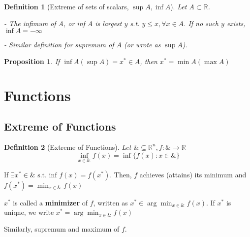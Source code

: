 \documentclass[11pt,a4paper]{article}
\newtheorem{definition}{Definition}
\newtheorem{proposition}{Proposition}
\begin{document}
\begin{definition}[Extreme of sets of scalars, $\sup A,\inf A$]
    Let $A\subset \mathbb{R}$.

    - The infimum of A, or inf A is largest $y$ s.t. $y \leqslant x, \forall x \in A$. If no such $y$ exists, $\inf A=-\infty$

    - Similar definition for supremum of $A$ (or wrote as $\sup A$).
\end{definition}
\begin{proposition}
    If $\inf A(\sup A)=x^*\in A$, then $x^*=\min A(\max A)$
\end{proposition}

\section{Functions}
\subsection{Extreme of Functions}
\begin{definition}[Extreme of Functions]
    Let $\& \subseteq \mathbb{R}^{n}, f: \& \rightarrow \mathbb{R}$
    $$\inf_{x \in \&} f(x)=\inf\{f(x): x \in \&\}$$
\end{definition}

If $\exists x^{*} \in \& \text { s.t. inf } f(x)=f\left(x^{*}\right)$. Then, $f$ achieves (attains) its minimum and $f\left(x^{*}\right)=\min _{x \in \&} f(x)$

$x^{*}$ is called a \textbf{minimizer} of $f$, written as $x^{*} \in \arg \min _{x \in \&} f(x)$. If $x^*$ is uniqne, we write $x^{*}=\arg \min _{x \in \&} f(x)
$

Similarly, supremum and maximum of $f$.
\end{document}
